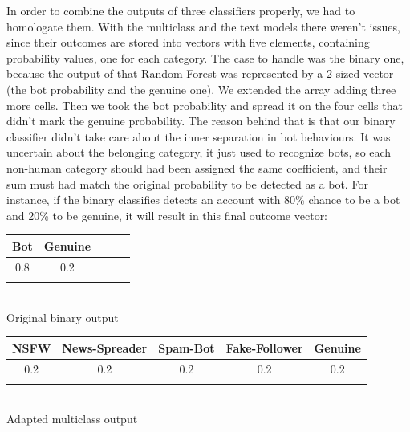 In order to combine the outputs of three classifiers properly, we had to homologate them.
With the multiclass and the text models there weren't issues, since their outcomes are stored into vectors with five elements, containing probability values, one for each category.
The case to handle was the binary one, because the output of that Random Forest was represented by a 2-sized vector (the bot probability and the genuine one).
We extended the array adding three more cells. Then we took the bot probability and spread it on the four cells that didn't mark the genuine probability.
The reason behind that is that our binary classifier didn't take care about the inner separation in bot behaviours. It was uncertain about the belonging category, it just used to recognize bots, so each non-human category should had been assigned the same coefficient, and their sum must had match the original probability to be detected as a bot.
For instance, if the binary classifies detects an account with 80\% chance to be a bot and 20\% to be genuine, it will result in this final outcome vector:
\begin{center}
	\begin{tabular}{ccccc}
		\\Bot&Genuine\\
		\hline
		0.8&0.2\\
		\hline\\
	\end{tabular}\\
Original binary output
\end{center}
	
\begin{center}
	\begin{tabular}{ccccc}
		\\NSFW&News-Spreader&Spam-Bot&Fake-Follower&Genuine\\
		\hline
		0.2&0.2&0.2&0.2&0.2\\
		\hline\\
	\end{tabular}\\
Adapted multiclass output
\end{center}


